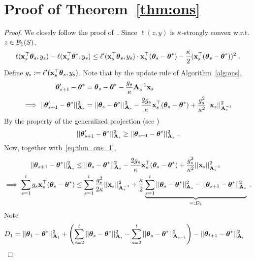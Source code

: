 \vspace{-5pt}
\section{Proof of Theorem~\ref{thm:ons}}
\vspace{-5pt}
\begin{proof}
  We closely follow the proof of~\citet{hazan07logarithmic}.
  Since $\ell(z,y)$ is $\kap$-strongly convex w.r.t. $z \in \cB_1(S)$,
  \begin{equation}\label{eq:thm_ons_0}
    \ell(\x_s^\T \th_s, y_s) - \ell(\x_s^\T\th^*,y_s) \le \ell'(\x_s^\T\th_s, y_s) \cdot \x_s^\T(\th_s - \th^*) - \fr{\kap}{2} (\x_s^\T(\th_s-\th^*))^2  \;.
  \end{equation}
  Define $g_s := \ell'(\x_s^\T\th_s, y_s)$.
  Note that by the update rule of Algorithm~\ref{alg:ons},
  \begin{align}    
    \th'_{s+1} - \th^* &= \th_s - \th^* - \fr{g_s}{\kap}\A_s^{-1}\x_s \notag
\\\implies ||\th'_{s+1} - \th^* ||^2_{\A_s} &= ||\th_s - \th^*||^2_{\A_s} - \fr{2g_s}{\kap}\x_s^\T(\th_s-\th^*) + \fr{g_s^2}{\kap^2}||\x_s||^2_{\A_s^{-1}}  \label{eq:thm_ons_1}
  \end{align}
  By the property of the generalized projection (see \citet[Lemma 8]{hazan07logarithmic})
  \[
    ||\th'_{s+1} - \th^*||^2_{\A_s} \ge || \th_{s+1} - \th^* ||^2_{\A_s} \;.
  \]
  Now, together with~\eqref{eq:thm_ons_1}, 
  \begin{equation*}\begin{aligned}
   ||\th_{s+1} - \th^* ||^2_{\A_s} &\le ||\th_s - \th^*||^2_{\A_s} - \fr{2g_s}{\kap}\x_s^\T(\th_s-\th^*) + \fr{g_s^2}{\kap^2}||\x_s||^2_{\A_s^{-1}}
  \\\implies \sum_{s=1}^t  g_s\x_s^\T(\th_s-\th^*) &\le \sum_{s=1}^t\fr{g_s^2}{2\kap}||\x_s||^2_{\A_s^{-1}} + \fr{\kap}{2} \underbrace{ \sum_{s=1}^t ||\th_s - \th^*||^2_{\A_s} - ||\th_{s+1} - \th^* ||^2_{\A_s} }_{=:D_1}  \;.
  \end{aligned}\end{equation*}
  Note 
  \begin{equation*}\begin{aligned}
  D_1  &= ||\th_1 - \th^* ||^2_{\A_1} + \lt(\sum_{s=2}^t || \th_s - \th^* ||^2_{\A_s} - \sum_{s=2}^t ||\th_s - \th^*||^2_{\A_{s-1}}\rt) - ||\th_{t+1} - \th^*||^2_{\A_{t}} 

\end{aligned}
\end{equation*}
\end{proof}
